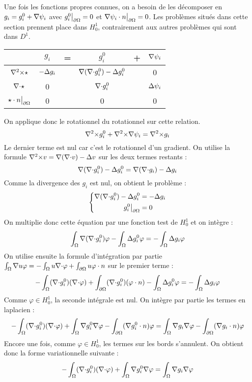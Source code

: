 Une fois les fonctions propres connues, on a besoin de les décomposer en $g_i=g_i^0+{\nabla}\psi_i$ avec $g_i^0{\big\rvert_{\partial\Omega}} = 0$ et ${\nabla}\psi_i\cdot n{\big\rvert_{\partial\Omega}} = 0$. Les problèmes situés dans cette section prennent place dans $H^1_0$, contrairement aux autres problèmes qui sont dans $D^1$.\\
\begin{center}
\begin{tabular}{c|ccccc}
& $g_i$ & = & $g_i^0$ & + & ${\nabla}\psi_i$ \\ \hline
${\nabla^2\times}\star$ & $-{\Delta} g_i$ & & ${\nabla}({\nabla\cdot} g_i^0)-{\Delta} g_i^0$ & & 0\\ \hline
${\nabla\cdot}\star$ & 0 & & ${\nabla\cdot} g_i^0$ & & ${\Delta}\psi_i$\\ \hline
$\star\cdot n{\big\rvert_{\partial\Omega}}$ & 0 & & 0 & & 0
\end{tabular}
\end{center}
On applique donc le rotationnel du rotationnel sur cette relation.\\
\[
{\nabla^2\times} g_i^0 +{\nabla^2\times}{\nabla}\psi_i = {\nabla^2\times} g_i
\]
Le dernier terme est nul car c'est le rotationnel d'un gradient. On utilise la formule ${\nabla^2\times} v={\nabla}({\nabla\cdot} v)-{\Delta} v$ sur les deux termes restants :
\[
{\nabla}({\nabla\cdot} g_i^0)-{\Delta} g_i^0 = {\nabla}({\nabla\cdot} g_i)-{\Delta} g_i
\]
Comme la divergence des $g_i$ est nul, on obtient le problème :
\begin{eqnarray}
\label{gi0}
\left\{
\begin{aligned}
{\nabla}({\nabla\cdot} g_i^0)-{\Delta} g_i^0 &= -{\Delta} g_i\\
g_i^0{\big\rvert_{\partial\Omega}} &= 0
\end{aligned}
\right.
\end{eqnarray}
On multiplie donc cette équation par une fonction test de $H^1_0$ et on intègre :
\[
\int_\Omega {\nabla}({\nabla\cdot} g_i^0)\varphi - \int_\Omega {\Delta} g_i^0\varphi = -\int_\Omega {\Delta} g_i\varphi
\]
On utilise ensuite la formule d'intégration par partie $\int_\Omega {\nabla} u\varphi = -\int_\Omega u{\nabla\cdot}\varphi + \int_{\partial\Omega} u\varphi\cdot n$ sur le premier terme : 
\[
-\int_\Omega ({\nabla\cdot} g_i^0)({\nabla\cdot}\varphi) + \int_{\partial\Omega} ({\nabla\cdot} g_i^0)(\varphi\cdot n) - \int_\Omega {\Delta} g_i^0\varphi = -\int_\Omega {\Delta} g_i\varphi
\]
Comme $\varphi\in H^1_0$, la seconde intégrale est nul. On intègre par partie les termes en laplacien :
\[
-\int_\Omega ({\nabla\cdot} g_i^0)({\nabla\cdot}\varphi) + \int_\Omega {\nabla} g_i^0{\nabla}\varphi - \int_{\partial\Omega} ({\nabla} g_i^0\cdot n)\varphi = \int_\Omega {\nabla} g_i{\nabla}\varphi - \int_{\partial\Omega} ({\nabla} g_i\cdot n)\varphi
\]
Encore une fois, comme $\varphi\in H^1_0$, les termes sur les bords s'annulent. On obtient donc la forme variationnelle suivante :
\begin{eqnarray}
\label{fvgi0}
-\int_\Omega ({\nabla\cdot} g_i^0)({\nabla\cdot}\varphi) + \int_\Omega {\nabla} g_i^0{\nabla}\varphi = \int_\Omega {\nabla} g_i{\nabla}\varphi
\end{eqnarray}

